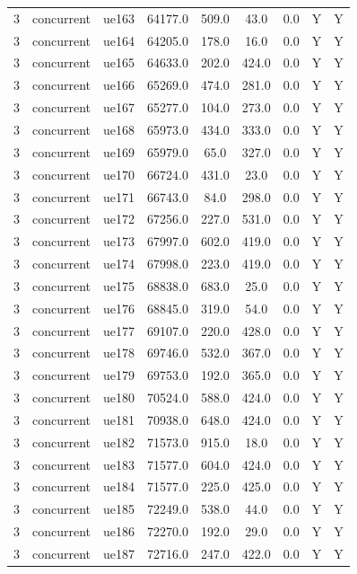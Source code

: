 \begin{table}[ht]
\begin{tabular}{|c|c|c|c|c|c|c|c|c|}
3 & concurrent & ue163 & 64177.0 & 509.0 & 43.0 & 0.0 & Y & Y \\
3 & concurrent & ue164 & 64205.0 & 178.0 & 16.0 & 0.0 & Y & Y \\
3 & concurrent & ue165 & 64633.0 & 202.0 & 424.0 & 0.0 & Y & Y \\
3 & concurrent & ue166 & 65269.0 & 474.0 & 281.0 & 0.0 & Y & Y \\
3 & concurrent & ue167 & 65277.0 & 104.0 & 273.0 & 0.0 & Y & Y \\
3 & concurrent & ue168 & 65973.0 & 434.0 & 333.0 & 0.0 & Y & Y \\
3 & concurrent & ue169 & 65979.0 & 65.0 & 327.0 & 0.0 & Y & Y \\
3 & concurrent & ue170 & 66724.0 & 431.0 & 23.0 & 0.0 & Y & Y \\
3 & concurrent & ue171 & 66743.0 & 84.0 & 298.0 & 0.0 & Y & Y \\
3 & concurrent & ue172 & 67256.0 & 227.0 & 531.0 & 0.0 & Y & Y \\
3 & concurrent & ue173 & 67997.0 & 602.0 & 419.0 & 0.0 & Y & Y \\
3 & concurrent & ue174 & 67998.0 & 223.0 & 419.0 & 0.0 & Y & Y \\
3 & concurrent & ue175 & 68838.0 & 683.0 & 25.0 & 0.0 & Y & Y \\
3 & concurrent & ue176 & 68845.0 & 319.0 & 54.0 & 0.0 & Y & Y \\
3 & concurrent & ue177 & 69107.0 & 220.0 & 428.0 & 0.0 & Y & Y \\
3 & concurrent & ue178 & 69746.0 & 532.0 & 367.0 & 0.0 & Y & Y \\
3 & concurrent & ue179 & 69753.0 & 192.0 & 365.0 & 0.0 & Y & Y \\
3 & concurrent & ue180 & 70524.0 & 588.0 & 424.0 & 0.0 & Y & Y \\
3 & concurrent & ue181 & 70938.0 & 648.0 & 424.0 & 0.0 & Y & Y \\
3 & concurrent & ue182 & 71573.0 & 915.0 & 18.0 & 0.0 & Y & Y \\
3 & concurrent & ue183 & 71577.0 & 604.0 & 424.0 & 0.0 & Y & Y \\
3 & concurrent & ue184 & 71577.0 & 225.0 & 425.0 & 0.0 & Y & Y \\
3 & concurrent & ue185 & 72249.0 & 538.0 & 44.0 & 0.0 & Y & Y \\
3 & concurrent & ue186 & 72270.0 & 192.0 & 29.0 & 0.0 & Y & Y \\
3 & concurrent & ue187 & 72716.0 & 247.0 & 422.0 & 0.0 & Y & Y \\

\end{tabular}
\end{table}
